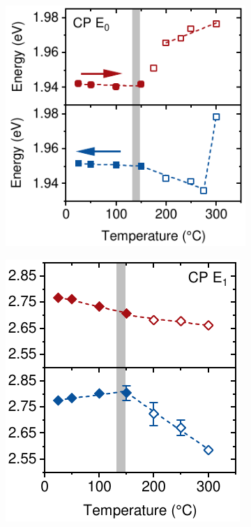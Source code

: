 \begin{figure}[ht!]
    \centering
    \begin{subfigure}{0.34\textwidth}
        \includegraphics[width=\textwidth]{chapters/ellipsometry/image/CP0.pdf}
        \caption{}
        \label{fig:ellipsometry:CP0}
    \end{subfigure}
    \hfill
    \begin{subfigure}{0.31\textwidth}
        \includegraphics[width=\textwidth]{chapters/ellipsometry/image/CP1.pdf}

\end{subfigure}
\end{figure}

